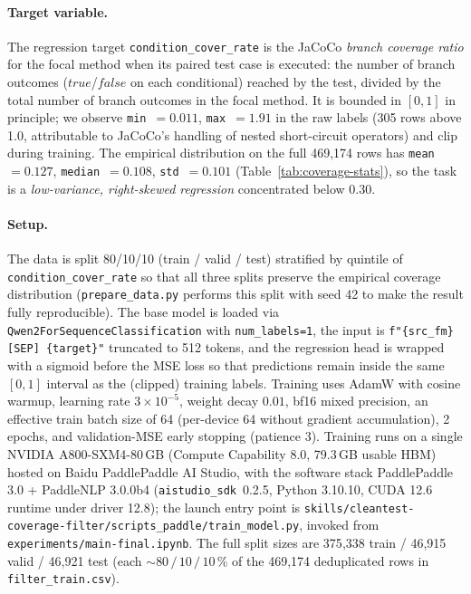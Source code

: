 \documentclass[acmlarge,nonacm,screen]{acmart}
\begin{document}
\paragraph{Target variable.}
The regression target \texttt{condition\_cover\_rate} is the JaCoCo
\emph{branch coverage ratio} for the focal method when its paired
test case is executed: the number of branch outcomes
($\textit{true}$/$\textit{false}$ on each conditional) reached by
the test, divided by the total number of branch outcomes in the
focal method. It is bounded in $[0, 1]$ in principle; we observe
\texttt{min}~$=0.011$, \texttt{max}~$=1.91$ in the raw labels
(305 rows above 1.0, attributable to JaCoCo's handling of nested
short-circuit operators) and clip during training. The empirical
distribution on the full 469{,}174 rows has \texttt{mean}~$=0.127$,
\texttt{median}~$=0.108$, \texttt{std}~$=0.101$
(Table~\ref{tab:coverage-stats}), so the task is a
\emph{low-variance, right-skewed regression} concentrated below
0.30.

\paragraph{Setup.} The data is split 80/10/10 (train / valid /
test) stratified by quintile of \texttt{condition\_cover\_rate} so
that all three splits preserve the empirical coverage distribution
(\texttt{prepare\_data.py} performs this split with seed 42 to make
the result fully reproducible). The base model is loaded via
\texttt{Qwen2ForSequenceClassification} with
\texttt{num\_labels=1}, the input is
\texttt{f"\{src\_fm\} [SEP] \{target\}"} truncated to 512 tokens,
and the regression head is wrapped with a sigmoid before the MSE
loss so that predictions remain inside the same $[0, 1]$ interval as
the (clipped) training labels. Training uses AdamW with cosine
warmup, learning rate $3 \times 10^{-5}$, weight decay $0.01$,
bf16 mixed precision, an effective train batch size of 64
(per-device 64 without gradient accumulation), 2 epochs, and
validation-MSE early stopping (patience 3). Training runs on a
single NVIDIA A800-SXM4-80\,GB (Compute Capability 8.0, 79.3\,GB
usable HBM) hosted on Baidu PaddlePaddle AI Studio, with the
software stack PaddlePaddle 3.0 + PaddleNLP 3.0.0b4
(\texttt{aistudio\_sdk}~0.2.5, Python 3.10.10, CUDA 12.6 runtime
under driver 12.8); the launch entry point is
\texttt{skills/\allowbreak cleantest-coverage-filter/\allowbreak scripts\_paddle/\allowbreak train\_model.py},
invoked from \texttt{experiments/main-final.ipynb}. The full
split sizes are 375{,}338 train / 46{,}915 valid / 46{,}921 test
(each $\sim 80\,/\,10\,/\,10$\,\% of the 469{,}174 deduplicated
rows in \texttt{filter\_train.csv}).
\end{document}
